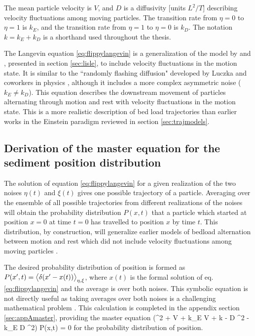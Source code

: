 The mean particle velocity is $V$, and $D$ is a diffusivity [units $L^2/T$] describing velocity fluctuations among moving particles. The transition rate from $\eta=0$ to $\eta = 1$ is $k_E$, and the transition rate from $\eta=1$ to $\eta= 0$ is $k_D$. The notation $k=k_E+k_D$ is a shorthand used throughout the thesis.

The Langevin equation \ref{eq:flippylangevin} is a generalization of the model by \citet{Lisle1998} and \citet{Lajeunesse2017}, presented in section \ref{sec:lisle}, to include velocity fluctuations in the motion state.
It is similar to the ``randomly flashing diffusion" developed by Luczka and coworkers in physics \citep{Luczka1992,Luczka1993,Luczka1995}, although it includes a more complex asymmetric noise ($k_E\neq k_D$).
This equation describes the downstream movement of particles alternating through motion and rest with velocity fluctuations in the motion state. This is a more realistic description of bed load trajectories than earlier works in the Einstein paradigm reviewed in section \ref{sec:trajmodels}.

\subsection{Derivation of the master equation for the sediment position distribution}
\label{sec:floppymastereq}
The solution of equation \ref{eq:flippylangevin} for a given realization of the two noises $\eta(t)$ and $\xi(t)$ gives one possible trajectory of a particle. Averaging over the ensemble of all possible trajectories from different realizations of the noises will obtain the probability distribution $P(x,t)$ that a particle which started at position $x=0$ at time $t=0$ has travelled to position $x$ by time $t$. This distribution, by construction, will generalize earlier models of bedload alternation between motion and rest which did not include velocity fluctuations among moving particles \citep{Lisle1998,Lajeunesse2017}.

The desired probability distribution of position is formed as $ P(x',t) = \big\langle \delta(x'-x(t))\big\rangle_{\eta,\xi} $, where $x(t)$ is the formal solution of eq. \ref{eq:flippylangevin} and the average is over both noises.
This symbolic equation is not directly useful as taking averages over both noises is a challenging mathematical problem \citep{Hanggi1978}. This calculation is completed in the appendix section \ref{sec:appAmaster}, providing the master equation
\be (\pt^2 + V \px \pt + k_E V \px + k \pt - D \px^2 \pt - k_E D \px^2) P(x,t) = 0 \label{eq:flippymaster}\ee
for the probability distribution of position.

